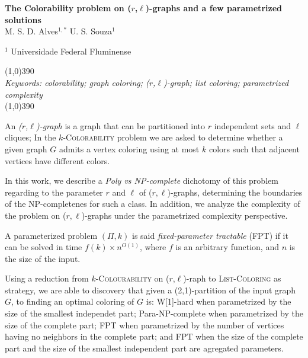 \documentclass[12pt]{article}
\begin{document}
\pagestyle{empty}

\begin{center}
\Large

{\bf The {Colorability} problem on ($r$,$\ell$)-graphs and a few parametrized solutions }\\[0.2in]

\large
%
%
%
M. S. D. Alves$^{1,*}$\hspace{.2cm}
U. S. Souza$^1$\hspace{.2cm}

%
$^1$ Universidade Federal Fluminense

\end{center}
\normalsize
\vspace{-2.0ex}

%
\noindent\line(1,0){390}\\
%
{\it Keywords: colorability; graph coloring; ($r$,$\ell$)-graph; list coloring; parametrized complexity}\\%
%
\line(1,0){390}\\
\vspace{-2.0ex}
\sloppy

An \emph{($r$,$\ell$)-graph} is a graph that can be partitioned into $r$ independent sets and $\ell$ cliques; In 
the \textsc{$k$-Colorability} problem we are asked to determine whether a given graph $G$ admits a vertex coloring using at most $k$ colors such that adjacent vertices have different colors.

In this work, we describe a \emph{Poly vs NP-complete} dichotomy of this problem regarding to the parameter $r$ and $\ell$ of ($r,\ell$)-graphs, determining the boundaries of the NP-completenes for such a class. In addition, we analyze the complexity of the problem on ($r,\ell$)-graphs under the parametrized complexity perspective. 
 
A parameterized problem $(\Pi,k)$ is said \emph{fixed-parameter tractable} (FPT) if it can be solved in time $f(k)\times n^{O(1)}$, where $f$ is an arbitrary function, and $n$ is the size of the input. 
 
Using a reduction from \textsc{$k$-Colourability} on ($r$,$\ell$)-raph to \textsc{List-Coloring} as strategy, we are able to discovery that given a (2,1)-partition of the input graph $G$, to finding an optimal coloring of $G$ is: W[1]-hard when parametrized by the size of the smallest independet part; Para-NP-complete when parametrized by the size of the complete part; FPT when parametrized by the number of vertices having no neighbors in the complete part; and FPT when the size of the complete part and the size of the smallest independent part are agregated parameters.
 
\end{document}
